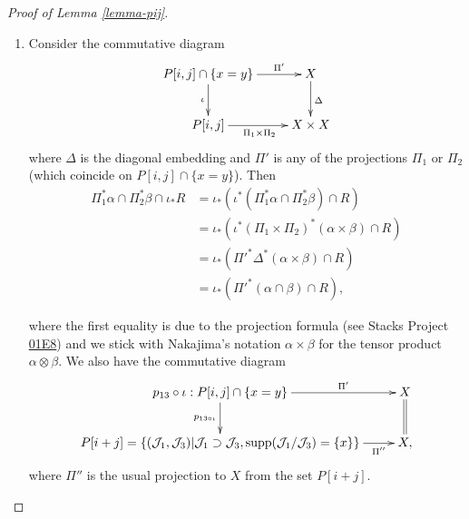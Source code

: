 \begin{proof}[Proof of Lemma \ref{lemma-pij}]
\begin{enumerate}
\medskip\noindent
(Caveat: it looks to me that the choice of $\mathcal{J}_2'$ is not unique.
Indeed, the space of schemes of length $j$ supported
in the point $x$ was discussed in the proof of Lemma \ref{lemma-dimension},
where we used the fact that it has dimension $j-1$.)

\medskip\noindent
Defining $\mathcal{J}'_2$ this way implies that
$$
\mathcal{J}_1/\mathcal{J}_2'=\mathcal{J}_1/(\mathcal{J}_1\cup \{x\})
=\{x\}=\mathcal{J}_2/\mathcal{J}_3.
$$
Now, we also must have $\mathcal{J}_1/\mathcal{J}_2=\{y\}$ 
for some $y \in X$ with multiplicity $i$.
This implies that $\mathcal{J}_1/\mathcal{J}_3=\{x\}\cup \{y\}$ 
with their multiplicities.
Then 
$$
\mathcal{J}_2'/\mathcal{J}_3=(\mathcal{J}_1\cup \{x\})/\mathcal{J}_3=\{y\}
=\mathcal{J}_1/\mathcal{J}_2
$$
as required.
An inverse function 
defined similarly shows this is a bijection.

\item Consider the commutative diagram
$$
\xymatrix{
P[i,j]\cap \{x=y\}\ar[r]^-{\Pi'}\ar[d]_{\iota}&X\ar[d]^{\Delta}\\
P[i,j]\ar[r]_{\Pi_1 \times \Pi_2}&X \times X
}
$$
where $\Delta$ is the diagonal embedding
and $\Pi'$ is any of the projections $\Pi_1$ or $\Pi_2$
(which coincide on  $P[i,j]\cap \{x=y\}$).
Then
\begin{equation}
\label{equation-lemma2-1}
\begin{aligned}
\Pi_1^*\alpha \cap \Pi_2^*\beta \cap\iota_*R
&=\iota_*(\iota^*(\Pi_1^*\alpha\cap\Pi_2^*\beta)\cap R)\\
&=\iota_*(\iota^*(\Pi_1\times\Pi_2)^*(\alpha\times\beta)\cap R)\\
&=\iota_*({\Pi'}^*\Delta^*(\alpha\times\beta)\cap R)\\
&=\iota_*({\Pi'}^*(\alpha\cap\beta)\cap R),
\end{aligned}
\end{equation}

\noindent
where the first equality is due
to the projection formula
(see Stacks Project 
\href{https://stacks.math.columbia.edu/tag/01E8}{01E8})
and we stick with Nakajima's notation $\alpha \times \beta$ 
for the tensor product $\alpha \otimes \beta$.
We also have the commutative diagram
$$
\xymatrix{
p_{13}\circ \iota:P[i,j]\cap\{x=y\}
\ar[r]^-{\Pi'}\ar[d]_{p_{13 \circ \iota}}&X\ar@{=}[d]\\
P[i+j]=\{(\mathcal{J}_1,\mathcal{J}_3)|\mathcal{J}_1 \supset \mathcal{J}_3,
\text{supp}(\mathcal{J}_1/\mathcal{J}_3)=\{x\}\}\ar[r]_-{\Pi''}&X,
}
$$
where $\Pi''$ is the usual projection to $X$ from the
set $P[i+j]$.


\end{enumerate}
\end{proof}
